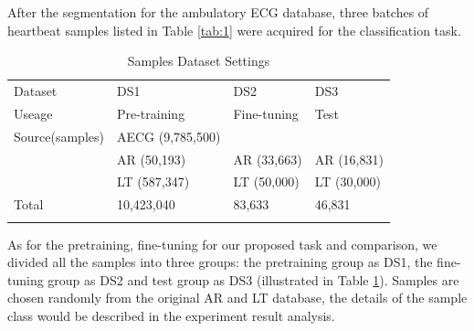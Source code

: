 \documentclass[graybox]{svmult}
\begin{document}
After the segmentation for the ambulatory ECG database, three batches of heartbeat samples listed in Table \ref{tab:1} were acquired for the classification task. 



\begin{table}
\caption{Samples Dataset Settings}
\label{tab:2}       %
%
%
\begin{tabular}{p{2.9cm}p{2.8cm}p{2.8cm}p{2.8cm}}
\hline\noalign{\smallskip}
Dataset & DS1 & DS2 & DS3   \\
\noalign{\smallskip}\svhline\noalign{\smallskip}
Useage & Pre-training & Fine-tuning & Test   \\
Source(samples) & AECG (9,785,500)  &   &    \\
  & AR (50,193)   & AR (33,663) & AR (16,831) \\
  & LT (587,347)  & LT (50,000) & LT (30,000) \\
\noalign{\smallskip}\hline\noalign{\smallskip}
Total & 10,423,040 & 83,633 & 46,831 \\
\noalign{\smallskip}\hline\noalign{\smallskip}
\end{tabular}
\end{table}


As for the pretraining, fine-tuning for our proposed task and comparison, we divided all the samples into three groups: the pretraining group as DS1, the fine-tuning group as DS2 and test group as DS3 (illustrated in Table \ref{tab:2}). Samples are chosen randomly from the original AR and LT database, the details of the sample class would be described in the experiment result analysis.
\end{document}
